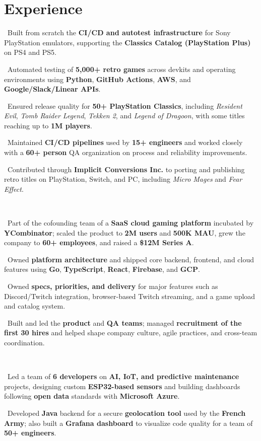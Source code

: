 \documentclass{muratcan_cv}
\newcommand{\tightbullet}[1]{\coloredbullet\ #1\par}
\renewcommand{\explanationdetail}[1]{%
    \indent \indent \begin{minipage}{0.87\linewidth} \fontsize{8.35pt}{9.7pt}\selectfont #1 \end{minipage} \\[0.03cm]
}
\begin{document}
\section{Experience}
\explanationdetail{
    \tightbullet{Built from scratch the \textbf{CI/CD and autotest infrastructure} for Sony PlayStation emulators, supporting the \textbf{Classics Catalog (PlayStation Plus)} on PS4 and PS5.}
    \tightbullet{Automated testing of \textbf{5,000+ retro games} across devkits and operating environments using \textbf{Python}, \textbf{GitHub Actions}, \textbf{AWS}, and \textbf{Google/Slack/Linear APIs}.}
    \tightbullet{Ensured release quality for \textbf{50+ PlayStation Classics}, including \textit{Resident Evil}, \textit{Tomb Raider Legend}, \textit{Tekken 2}, and \textit{Legend of Dragoon}, with some titles reaching up to \textbf{1M players}.}
    \tightbullet{Maintained \textbf{CI/CD pipelines} used by \textbf{15+ engineers} and worked closely with a \textbf{60+ person} QA organization on process and reliability improvements.}
    \tightbullet{Contributed through \textbf{Implicit Conversions Inc.} to porting and publishing retro titles on PlayStation, Switch, and PC, including \textit{Micro Mages} and \textit{Fear Effect}.}
}

\explanationdetail{
    \tightbullet{Part of the cofounding team of a \textbf{SaaS cloud gaming platform} incubated by \textbf{YCombinator}; scaled the product to \textbf{2M users} and \textbf{500K MAU}, grew the company to \textbf{60+ employees}, and raised a \textbf{\$12M Series A}.}
    \tightbullet{Owned \textbf{platform architecture} and shipped core backend, frontend, and cloud features using \textbf{Go}, \textbf{TypeScript}, \textbf{React}, \textbf{Firebase}, and \textbf{GCP}.}
    \tightbullet{Owned \textbf{specs, priorities, and delivery} for major features such as Discord/Twitch integration, browser-based Twitch streaming, and a game upload and catalog system.}
    \tightbullet{Built and led the \textbf{product} and \textbf{QA teams}; managed \textbf{recruitment of the first 30 hires} and helped shape company culture, agile practices, and cross-team coordination.}
}

\explanationdetail{
    \tightbullet{Led a team of \textbf{6 developers} on \textbf{AI, IoT, and predictive maintenance} projects, designing custom \textbf{ESP32-based sensors} and building dashboards following \textbf{open data} standards with \textbf{Microsoft Azure}.}
    \tightbullet{Developed \textbf{Java} backend for a secure \textbf{geolocation tool} used by the \textbf{French Army}; also built a \textbf{Grafana dashboard} to visualize code quality for a team of \textbf{50+ engineers}.}
}
\end{document}
